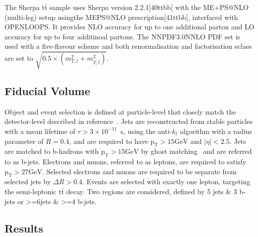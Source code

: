 The Sherpa $\mathrm{t\bar{t}}$ sample uses Sherpa version 2.2.1[40ttbb] with the ME+PS@NLO (multi-leg) setup usingthe MEPS@NLO prescription[41ttbb], interfaced with OPENLOOPS. It provides NLO accuracy for up to one additional parton and LO accuracy for up to four additinoal partons. The NNPDF3.0NNLO PDF set is used with a five-flavour scheme and both renormalisation and factorisation sclaes are set to $\sqrt{0.5\times(m_{T,t}^2+m_{T,\bar{t}}^2)}$. 


\subsection{Fiducial Volume}
Object and event selection is defined at particle-level that closely match the detector-level described in reference~\cite{HIGG-2017-03}. Jets are reconstructed from stable particles with a mean lifetime of $\tau > 3\times 10^{-11}$~s, using the anti-$k_t$ algorithm with a radius parameter of $R=0.4$, and are required to have $\mathrm{p_{T}>15 GeV}$ and $|\eta|< 2.5$. Jets are matched to b-hadrons with $\mathrm{p_{T}>15 GeV}$ by ghost matching~\cite{70ttbb} and are referred to as b-jets. Electrons and muons, referred to as leptons, are required to satisfy $\mathrm{p_{T}>27 GeV}$. Selected electrons and muons are required to be separate from selected jets by $\Delta R>0.4$. Events are selected with exactly one lepton, targeting the semi-leptonic $\mathrm{t\bar{t}}$ decay.
Two regions are considered, defined by 5 jets \& 3 b-jets or >=6jets \& >=4 b-jets.

\subsection{Results}